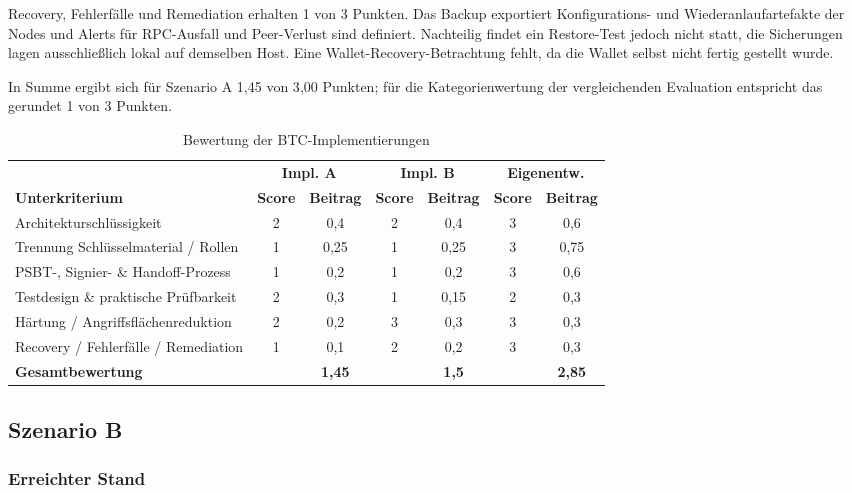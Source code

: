Recovery, Fehlerfälle und Remediation erhalten 1 von 3 Punkten. Das Backup exportiert Konfigurations- und Wiederanlaufartefakte der Nodes und Alerts für \ac{RPC}-Ausfall und Peer-Verlust sind definiert. 
Nachteilig findet ein Restore-Test jedoch nicht statt, die Sicherungen lagen ausschließlich lokal auf demselben Host. 
Eine Wallet-Recovery-Betrachtung fehlt, da die Wallet selbst nicht fertig gestellt wurde.\cite{runbookA,selfauditA}

In Summe ergibt sich für Szenario A 1{,}45 von 3{,}00 Punkten; für die Kategorienwertung der vergleichenden Evaluation entspricht das gerundet 1 von 3 Punkten.


\begin{table}[ht]
\centering
\footnotesize
\begin{tabular}{p{4.2cm}cc|cc|cc}
\hline
& \multicolumn{2}{c|}{\textbf{Impl. A}}
& \multicolumn{2}{c|}{\textbf{Impl. B}}
& \multicolumn{2}{c}{\textbf{Eigenentw.}} \\
\textbf{Unterkriterium} & \textbf{Score} & \textbf{Beitrag}
& \textbf{Score} & \textbf{Beitrag}
& \textbf{Score} & \textbf{Beitrag} \\
\hline
Architekturschlüssigkeit & 2 & 0,4 & 2 & 0,4 & 3 & 0,6 \\
Trennung Schlüsselmaterial / Rollen & 1 & 0,25 & 1 & 0,25 & 3 & 0,75 \\
\ac{PSBT}-, Signier- \& Handoff-Prozess & 1 & 0,2 & 1 & 0,2 & 3 & 0,6 \\
Testdesign \& praktische Prüfbarkeit & 2 & 0,3 & 1 & 0,15 & 2 & 0,3 \\
Härtung / Angriffsflächenreduktion & 2 & 0,2 & 3 & 0,3 & 3 & 0,3 \\
Recovery / Fehlerfälle / Remediation & 1 & 0,1 & 2 & 0,2 & 3 & 0,3 \\
\hline
\textbf{Gesamtbewertung} & & \textbf{1,45} & & \textbf{1,5} & & \textbf{2,85} \\
\hline
\end{tabular}
\caption{Bewertung der \ac{BTC}-Implementierungen}
\label{tab:btc-detailbewertung}
\end{table}


\subsection{Szenario B}

\subsubsection{Erreichter Stand}

